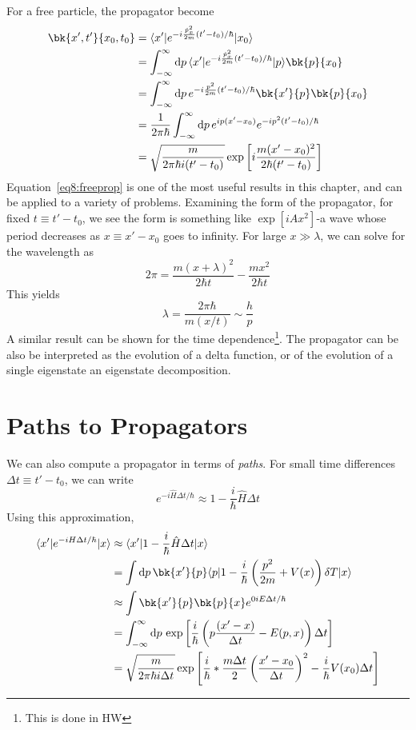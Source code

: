 For a free particle, the propagator become
\begin{align}
	\bk{x',t'}{x_0,t_0}&=\b{x'}e^{-i\frac{\hat p_x^2}{2m}(t'-t_0)/\hbar}\k{x_0}\nonumber\\
			   &=\int_{-\infty}^\infty\d{p}\b{x'}e^{-i\frac{\hat p_x^2}{2m}(t'-t_0)/\hbar}\k{p}\bk{p}{x_0}\nonumber\\
			   &=\int_{-\infty}^\infty\d{p}e^{-i\frac{p^2}{2m}(t'-t_0)/\hbar}\bk{x'}{p}\bk{p}{x_0}\nonumber\\
			   &=\frac{1}{2\pi\hbar}\int_{-\infty}^\infty\d p e^{ip(x'-x_0)}e^{-ip^2(t'-t_0)/\hbar}\nonumber\\
			   &=\sqrt{\frac{m}{2\pi \hbar i (t'-t_0)}}\exp\left[i\frac{m(x'-x_0)^2}{2\hbar(t'-t_0)}\right]\label{eq8:freeprop}
\end{align}
Equation~\ref{eq8:freeprop} is one of the most useful results in this chapter, and can be applied to a variety of problems. Examining the form of the propagator, for fixed \(t\equiv t'-t_0\), we see the form is something like \(\exp[iAx^2]\)-a wave whose period decreases as \(x\equiv x'-x_0\) goes to infinity. For large \(x\gg\lambda\), we can solve for the wavelength as
\[2\pi = \frac{m(x+\lambda)^2}{2\hbar t}-\frac{mx^2}{2\hbar t}\]
This yields
\begin{equation}
	\lambda = \frac{2\pi\hbar}{m(x/t)}\sim \frac{h}{p}
\end{equation}
A similar result can be shown for the time dependence\footnote{This is done in HW}. The propagator can be also be interpreted as the evolution of a delta function, or of the evolution of a single eigenstate an eigenstate decomposition.

\section{Paths to Propagators}
We can also compute a propagator in terms of \emph{paths}. For small time differences \(\Delta t \equiv t'-t_0\), we can write
\[e^{-i\hat H \Delta t/\hbar}\approx 1 - \frac{i}{\hbar}\hat H\Delta t\]
Using this approximation,
\begin{align*}
	\b{x'}e^{-iH\Delta t/\hbar}\k{x}
	&\approx \b{x'}1-\frac{i}{\hbar}\hat H\Delta t \k{x}\\
	&=\int \d{p}\bk{x'}{p}\b{p}1-\frac{i}{\hbar} \left(\frac{p^2}{2m}+V(x)\right)\delta T\k{x}\\
	&\approx \int\bk{x'}{p}\bk{p}{x}e^{0iE\Delta t/\hbar}\\
	&=\int_{-\infty}^\infty\d{p}\exp\left[\frac{i}{\hbar}\left(p\frac{(x'-x)}{\Delta t}-E(p,x)\right)\Delta t\right]\\
	&=\sqrt{\frac{m}{2\pi \hbar i\Delta t}}\exp\left[\frac{i}{\hbar}*\frac{m\Delta t}{2}\left(\frac{x'-x_0}{\Delta t}\right)^2-\frac{i}{\hbar}V(x_0)\Delta t\right]
\end{align*}

